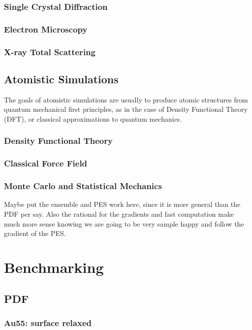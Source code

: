 \documentclass{uscthesis}
\theoremstyle{definition}
\theoremstyle{plain}
\begin{document}
\subsection{Single Crystal Diffraction}
\subsection{Electron Microscopy}
\subsection{X-ray Total Scattering}

\section{Atomistic Simulations}
The goals of atomistic simulations are usually to produce atomic structures from quantum mechanical first principles, as in the case of Density Functional Theory (DFT), or classical approximations to quantum mechanics.
\subsection{Density Functional Theory}
\subsection{Classical Force Field}
\subsection{Monte Carlo and Statistical Mechanics}

Maybe put the ensemble and PES work here, since it is more general than the PDF per say. Also the rational for the gradients and fast computation make much more sense knowing we are going to be very sample happy and follow the gradient of the PES.





\chapter{Benchmarking}
\section{PDF}
\subsection{Au55: surface relaxed}
\end{document}
